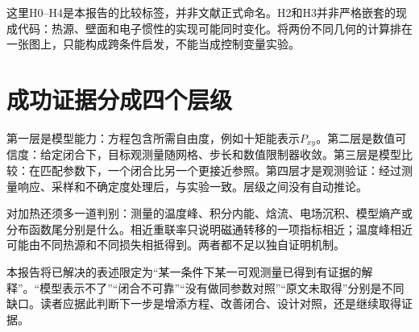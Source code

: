 这里H0--H4是本报告的比较标签，并非文献正式命名。H2和H3并非严格嵌套的现成代码：热源、壁面和电子惯性的实现可能同时变化。将两份不同几何的计算排在一张图上，只能构成跨条件启发，不能当成控制变量实验。

\section{成功证据分成四个层级}
第一层是模型能力：方程包含所需自由度，例如十矩能表示$P_{xy}$。第二层是数值可信度：给定闭合下，目标观测量随网格、步长和数值限制器收敛。第三层是模型比较：在匹配参数下，一个闭合比另一个更接近参照。第四层才是观测验证：经过测量响应、采样和不确定度处理后，与实验一致。层级之间没有自动推论。

对加热还须多一道判别：测量的温度峰、积分内能、焓流、电场沉积、模型熵产或分布函数尾分别是什么。相近重联率只说明磁通转移的一项指标相近；温度峰相近可能由不同热源和不同损失相抵得到。两者都不足以独自证明机制。

本报告将已解决的表述限定为“某一条件下某一可观测量已得到有证据的解释”。“模型表示不了”“闭合不可靠”“没有做同参数对照”“原文未取得”分别是不同缺口。读者应据此判断下一步是增添方程、改善闭合、设计对照，还是继续取得证据。
